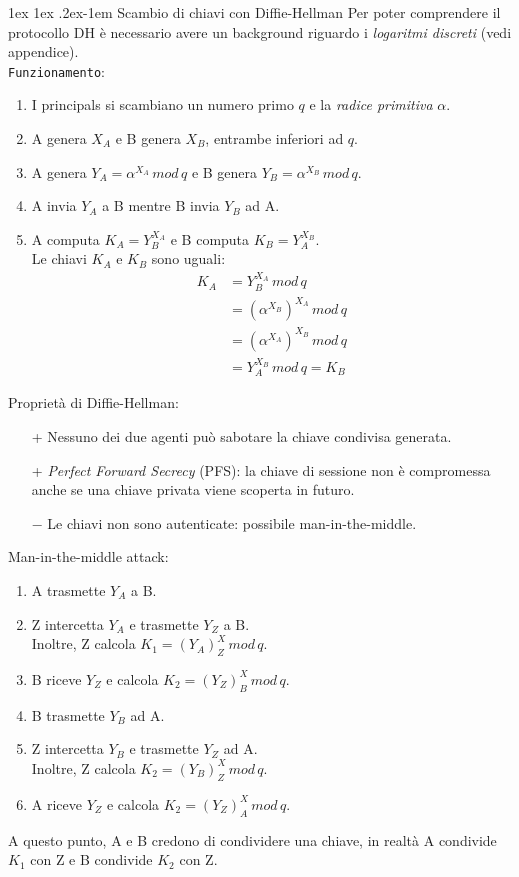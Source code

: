\documentclass[a4paper, 11pt, notitlepage, fleqn]{report}
\makeatletter
\renewcommand{\paragraph}{%
	\@startsection{paragraph}{4}%
	{\z@}{1ex \@plus 1ex \@minus .2ex}{-1em}%
	{\normalfont\normalsize\bfseries}%
}
\makeatother
\begin{document}
\paragraph{Scambio di chiavi con Diffie-Hellman}
Per poter comprendere il protocollo DH è necessario avere un background riguardo i \emph{logaritmi discreti} (vedi appendice).\\
\texttt{Funzionamento}:
\begin{enumerate}
	\item I principals si scambiano un numero primo $q$ e la \emph{radice primitiva} $\alpha$.
	\item A genera $X_A$ e B genera $X_B$, entrambe inferiori ad $q$.
	\item A genera $Y_A = \alpha^{X_A}\,mod\,q$ e B genera $Y_B = \alpha^{X_B}\,mod\,q$.
	\item A invia $Y_A$ a B mentre B invia $Y_B$ ad A.
	\item A computa $K_A = Y_B^{X_A}$ e B computa $K_B=Y_A^{X_B}$.\\
	Le chiavi $K_A$ e $K_B$ sono uguali:
	\begin{align*}
		K_A &= Y_B^{X_A}\,mod\,q\\
		&= (\alpha^{X_B})^{X_A}\,mod\,q\\
		&= (\alpha^{X_A})^{X_B}\,mod\,q\\
		&= Y_A^{X_B}\,mod\,q = K_B
	\end{align*}
\end{enumerate}
Proprietà di Diffie-Hellman:
\begin{itemize}
	\item[+] Nessuno dei due agenti può sabotare la chiave condivisa generata.
	\item[+] \emph{Perfect Forward Secrecy} (PFS): la chiave di sessione non è compromessa anche se una chiave privata viene scoperta in futuro.
	\item[$-$] Le chiavi non sono autenticate: possibile man-in-the-middle.
\end{itemize}
Man-in-the-middle attack:
\begin{enumerate}
	\item A trasmette $Y_A$ a B.
	\item Z intercetta $Y_A$ e trasmette $Y_Z$ a B.\\
	Inoltre, Z calcola $K_1 = (Y_A)^X_Z\,mod\,q$.
	\item B riceve $Y_Z$ e calcola $K_2 = (Y_Z)^X_B\,mod\,q$.
	\item B trasmette $Y_B$ ad A.
	\item Z intercetta $Y_B$ e trasmette $Y_Z$ ad A.\\
	Inoltre, Z calcola $K_2 = (Y_B)^X_Z\,mod\,q$.
	\item A riceve $Y_Z$ e calcola $K_2 = (Y_Z)^X_A\,mod\,q$.	
\end{enumerate}
A questo punto, A e B credono di condividere una chiave, in realtà A condivide $K_1$ con Z e B condivide $K_2$ con Z.
\end{document}
